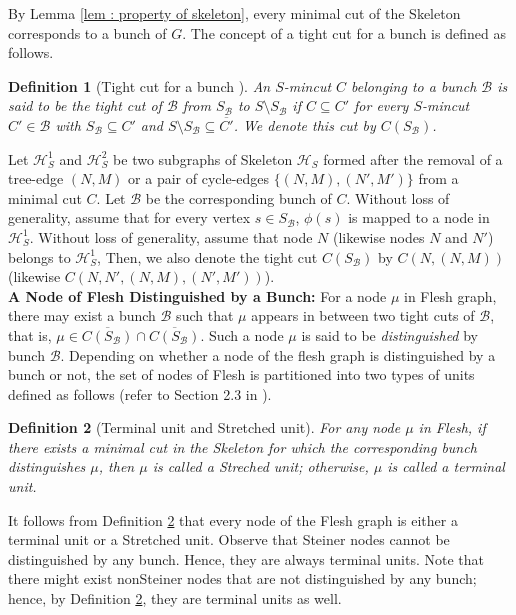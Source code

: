 \documentclass[letterpaper,11pt]{article}
\newtheorem{definition}{Definition}[]
\begin{document}
\noindent
By Lemma \ref{lem : property of skeleton}, every minimal cut of the Skeleton corresponds to a bunch of $G$. The concept of a tight cut for a bunch is defined as follows. 
\begin{definition}[Tight cut for a bunch \cite{DBLP:journals/siamcomp/DinitzV00, DBLP:conf/soda/DinitzV95, DBLP:conf/stoc/DinitzV94}] \label{def : tight cut}
An $S$-mincut $C$ belonging to a bunch ${\mathcal B}$ is said to be the tight cut of ${\mathcal B}$ from $S_{\mathcal B}$ to $S\setminus S_{\mathcal B}$ if $C\subseteq C'$ for every $S$-mincut $C'\in {\mathcal B}$ with $S_{\mathcal B}\subseteq C'$ and $S\setminus S_{\mathcal B} \subseteq \overline{C'}$. We denote this cut by $C(S_{\mathcal B})$.
\end{definition}
Let ${\mathcal H}_S^1$ and ${\mathcal H}_S^2$ be two subgraphs of Skeleton ${\mathcal H}_S$ formed after the removal of a tree-edge $(N,M)$ or a pair of cycle-edges $\{(N,M),(N',M')\}$ from a minimal cut $C$. Let ${\mathcal B}$ be the corresponding bunch of $C$. Without loss of generality, assume that for every vertex $s\in S_{\mathcal B}$, $\phi(s)$ is mapped to a node in ${\mathcal H}_S^1$. Without loss of generality, assume that node $N$ (likewise nodes $N$ and $N'$) belongs to ${\mathcal H}_S^1$, Then, we also denote the tight cut $C(S_{\mathcal B})$ by $C(N,(N,M))$ (likewise $C(N,N', (N,M), (N',M'))$). \\




\noindent
 \textbf{A Node of Flesh Distinguished by a Bunch:} For a node $\mu$ in Flesh graph, there may exist a bunch ${\mathcal B}$ such that $\mu$ appears in between two tight cuts of ${\mathcal B}$, that is, $\mu\in \overline{C(S_{\mathcal B})}\cap \overline{C(S_{\mathcal B})}$.  Such a node $\mu$ is said to be \textit{distinguished} by bunch ${\mathcal B}$.  Depending on whether a node of the flesh graph is distinguished by a bunch or not, the set of nodes of Flesh is partitioned into two types of units defined as follows (refer to Section 2.3 in \cite{DBLP:conf/stoc/DinitzN95}).
\begin{definition} [Terminal unit and Stretched unit] \label{def : terminal and nonterminal unit}
    For any node $\mu$ in Flesh, if there exists a minimal cut in the Skeleton for which the corresponding bunch distinguishes $\mu$, then $\mu$ is called a \textit{Streched unit}; otherwise, $\mu$ is called a \textit{terminal unit}.
\end{definition}
It follows from Definition \ref{def : terminal and nonterminal unit} that every node of the Flesh graph is either a terminal unit or a Stretched unit. Observe that Steiner nodes cannot be distinguished by any bunch. Hence, they are always terminal units. Note that there might exist nonSteiner nodes that are not distinguished by any bunch; hence, by Definition \ref{def : terminal and nonterminal unit}, they are terminal units as well. \\  
\end{document}
